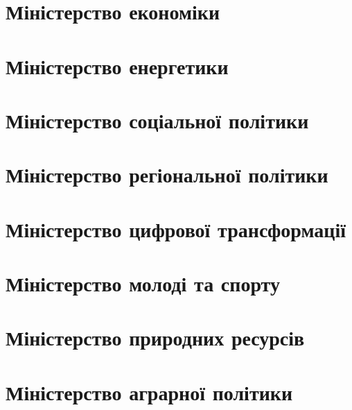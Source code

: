 \section{Міністерство економіки}

\section{Міністерство енергетики}

\section{Міністерство соціальної політики}

\section{Міністерство регіональної політики}

\section{Міністерство цифрової трансформації}

\section{Міністерство молоді та спорту}

\section{Міністерство природних ресурсів}

\section{Міністерство аграрної політики}

